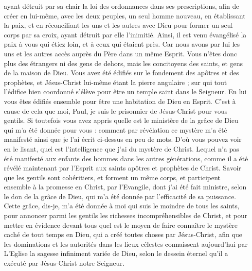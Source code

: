 \begin{multicols}{2}
ayant détruit par sa chair la loi des ordonnances dans ses prescriptions, afin de créer en lui-même, avec les deux peuples, un seul homme nouveau, en établissant la paix,
et en réconciliant les uns et les autres avec Dieu pour former un seul corps par sa croix, ayant détruit par elle l'inimitié.
Ainsi, il est venu évangélisé la paix à vous qui étiez loin, et à ceux qui étaient près.
Car nous avons par lui les uns et les autres accès auprès du Père dans un même Esprit.
Vous n'êtes donc plus des étrangers ni des gens de dehors, mais les concitoyens des saints, et gens de la maison de Dieu.
Vous avez été édifiés sur le fondement des apôtres et des prophètes, et Jésus-Christ lui-même étant la pierre angulaire ;
sur qui tout l'édifice bien coordonné s'élève pour être un temple saint dans le Seigneur.
En lui vous êtes édifiés ensemble pour être une habitation de Dieu en Esprit.
\VerseOne{}C’est à cause de cela que moi, Paul, je suis le prisonnier de Jésus-Christ pour vous gentils.
Si toutefois vous avez appris quelle est le ministère de la grâce de Dieu qui m'a été donnée pour vous :
comment par révélation ce mystère m'a été manifesté ainsi que je l'ai écrit ci-dessus en peu de mots.
D'où vous pouvez voir en le lisant, quel est l'intelligence que j'ai du mystère de Christ.
Lequel n'a pas été manifesté aux enfants des hommes dans les autres générations, comme il a été révélé maintenant par l'Esprit aux saints apôtres et prophètes de Christ.
Savoir que les gentils sont cohéritiers, et forment un même corps, et participent ensemble à la promesse en Christ, par l'Evangile,
dont j'ai été fait ministre, selon le don de la grâce de Dieu, qui m'a été donnée par l’efficacité de sa puissance.
Cette grâce, dis-je, m'a été donnée à moi qui suis le moindre de tous les saints, pour annoncer parmi les gentils les richesses incompréhensibles de Christ,
et pour mettre en évidence devant tous quel est le moyen de faire connaître le mystère caché de tout temps en Dieu, qui a créé toutes choses par Jésus-Christ,
afin que les dominations et les autorités dans les lieux célestes connaissent aujourd’hui par L’Eglise la sagesse infiniment variée de Dieu,
selon le dessein éternel qu’il a exécuté par Jésus-Christ notre Seigneur.

\end{multicols}
